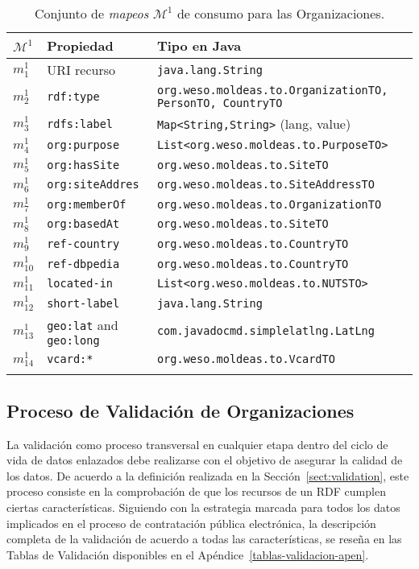 \begin{longtable}[c]{|p{2cm}|p{4.3cm}|p{8.5cm}|} 
\hline
  \textbf{$\mathcal{M}^1$} &  \textbf{Propiedad} & \textbf{Tipo en Java} \\\hline
\endhead
 $m^1_1$ & URI recurso     		& \texttt{java.lang.String} \\ \hline
 $m^1_2$ & \texttt{rdf:type}      	& \texttt{org.weso.moldeas.to.{OrganizationTO, PersonTO, CountryTO}}\\ \hline
 $m^1_3$ & \texttt{rdfs:label} 		& \texttt{Map<String,String>} (lang, value) \\ \hline
 $m^1_4$ & \texttt{org:purpose} 	& \texttt{List<org.weso.moldeas.to.PurposeTO>} \\ \hline
 $m^1_5$ & \texttt{org:hasSite}    	& \texttt{org.weso.moldeas.to.SiteTO} \\ \hline
 $m^1_6$ & \texttt{org:siteAddres} 	& \texttt{org.weso.moldeas.to.SiteAddressTO}  \\ \hline
 $m^1_7$ & \texttt{org:memberOf} 	& \texttt{org.weso.moldeas.to.OrganizationTO}\\ \hline
 $m^1_8$ & \texttt{org:basedAt} 	& \texttt{org.weso.moldeas.to.SiteTO} \\ \hline
 $m^1_9$ & \texttt{ref-country} 	& \texttt{org.weso.moldeas.to.CountryTO} \\ \hline  
 $m^1_{10}$ & \texttt{ref-dbpedia} & \texttt{org.weso.moldeas.to.CountryTO}   \\ \hline
 $m^1_{11}$ & \texttt{located-in}    & \texttt{List<org.weso.moldeas.to.NUTSTO>} \\ \hline   
 $m^1_{12}$ & \texttt{short-label} & \texttt{java.lang.String}\\ \hline   
 $m^1_{13}$ & \texttt{geo:lat} and  \texttt{geo:long} & \texttt{com.javadocmd.simplelatlng.LatLng} \\ \hline   
 $m^1_{14}$ & \texttt{vcard:*} 		& \texttt{org.weso.moldeas.to.VcardTO} \\ \hline   
\hline
\caption{Conjunto de \textit{mapeos} $\mathcal{M}^1$ de consumo para las Organizaciones.}\label{table:orgs-consumo}\\    
\end{longtable}

\subsection{Proceso de Validación de Organizaciones}
La validación como proceso transversal en cualquier etapa dentro del ciclo de vida de datos 
enlazados debe realizarse con el objetivo de asegurar la calidad de los datos. De acuerdo a la 
definición realizada en la Sección~\ref{sect:validation}, este proceso consiste en la comprobación 
de que los recursos de un \dataset RDF cumplen ciertas características. Siguiendo con la estrategia marcada para 
todos los datos implicados en el proceso de contratación pública electrónica, la descripción completa de la validación de acuerdo 
a todas las características, se reseña en las Tablas de Validación disponibles en el Apéndice~\ref{tablas-validacion-apen}.

